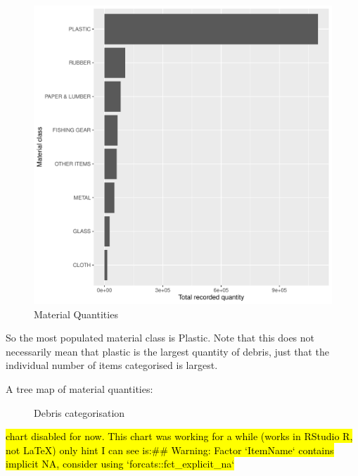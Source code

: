 \documentclass[10pt]{article}\usepackage[]{graphicx}\usepackage[]{color}
\makeatletter
\def\maxwidth{ %
  \ifdim\Gin@nat@width>\linewidth
    \linewidth
  \else
    \Gin@nat@width
  \fi
}
\newenvironment{knitrout}{}{} %
\makeatother
\begin{document}
\begin{figure}[H] %
\begin{center}
\begin{knitrout}
\color{fgcolor}
\includegraphics[width=\maxwidth]{figure/unnamed-chunk-11-1} 

\end{knitrout}
\caption {Material Quantities}
\label{figC}
\end {center}
\end {figure}

So the most populated material class is Plastic. Note that this does not necessarily mean that plastic is the largest quantity of debris, just that the individual number of items categorised is largest.

A tree map of material quantities:
\begin{figure}[H] %
\begin{center}

\caption {Debris categorisation}
\label{figI}
\end {center}
\end {figure}
\hl{chart disabled for now. This chart was working for a while (works in RStudio R, not LaTeX) only hint I can see is:\#\# Warning: Factor `ItemName` contains implicit NA, consider using `forcats::fct\_explicit\_na`}
\end{document}

